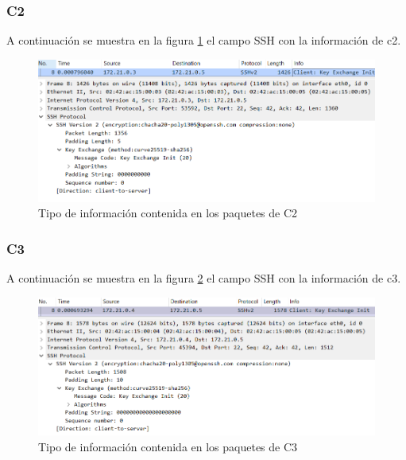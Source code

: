 \documentclass[letter,12pt]{article}
\begin{document}
\clearpage

\subsubsection{C2}


A continuación se muestra en la figura \ref{fig:textoplanoC2} el campo SSH con la información de c2.

\begin{figure}[ht]
    \centering
    \includegraphics[width=1\linewidth]{Images/parte1/textoplano/textoplanoC2.png}
    \caption{Tipo de información contenida en los paquetes de C2}
    \label{fig:textoplanoC2}
\end{figure}



\subsubsection{C3}

A continuación se muestra en la figura \ref{fig:textoplanoC3} el campo SSH con la información de c3.
\begin{figure}[ht]
    \centering
    \includegraphics[width=1\linewidth]{Images/parte1/textoplano/textoplanoC3.png}
    \caption{Tipo de información contenida en los paquetes de C3}
    \label{fig:textoplanoC3}
\end{figure}

\clearpage
\end{document}
